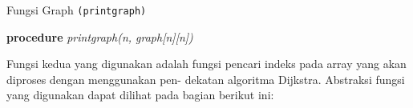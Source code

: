 \documentclass[conference]{IEEEtran}
\begin{document}
    \begin{algorithm}
        \SetAlgoLined
        \DontPrintSemicolon
        \caption{Fungsi Graph \texttt{(printgraph)}}
        \textbf{procedure} \emph{printgraph(n, graph[n][n])}\\
    \end{algorithm}

    Fungsi kedua yang digunakan adalah fungsi pencari indeks
    pada  array  yang  akan  diproses  dengan  menggunakan  pen-
    dekatan  algoritma  Dijkstra.  Abstraksi  fungsi  yang  digunakan
    dapat dilihat pada bagian berikut ini:
\end{document}
